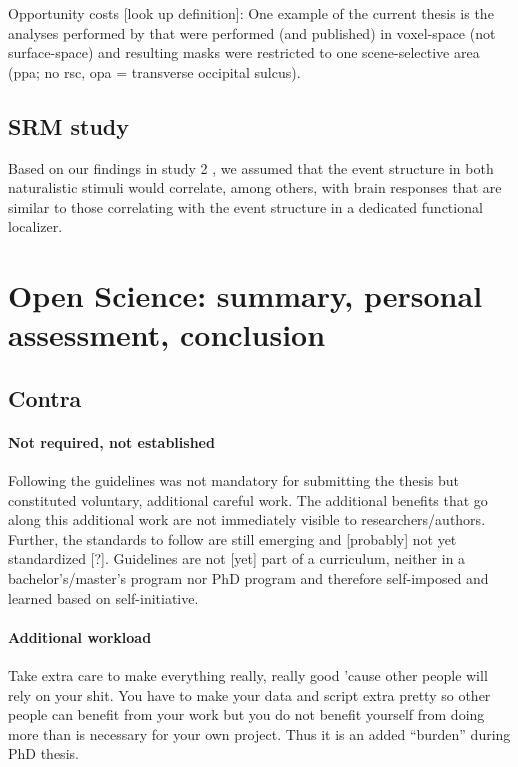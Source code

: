 %
Opportunity costs [look up definition]: One example of the current thesis is the
analyses performed by \citet{sengupta2016extension} that were performed (and
published) in voxel-space (not surface-space) and resulting masks were
restricted to one scene-selective area (\ac{ppa}; no \ac{rsc}, \ac{opa} =
transverse occipital sulcus).








\subsection{SRM study}

Based on our findings in study 2 \citep{haeusler2022processing}, we assumed that
the event structure in both naturalistic stimuli would correlate, among others,
with brain responses that are similar to those correlating with the event
structure in a dedicated functional localizer.








\section{Open Science: summary, personal assessment, conclusion}


\subsection{Contra}

\paragraph{Not required, not established}
%
Following the guidelines was not mandatory for submitting the thesis but
constituted voluntary, additional careful work.
%
The additional benefits that go along this additional work are not immediately
visible to researchers/authors.
%
Further, the standards to follow are still emerging and [probably] not yet
standardized [?].
%
Guidelines are not [yet] part of a curriculum, neither in a bachelor's/master's
program nor PhD program and therefore self-imposed and learned based on
self-initiative.


\paragraph{Additional workload}
%
Take extra care to make everything really, really good 'cause other people will
rely on your shit.
%
You have to make your data and script extra pretty so other people can benefit
from your work but you do not benefit yourself from doing more than is necessary
for your own project.
%
Thus it is an added ``burden'' during PhD thesis.

